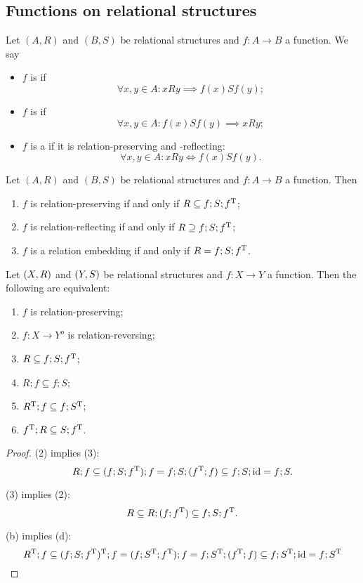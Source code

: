 \subsection{Functions on relational structures}
\begin{definition}
Let $(A, R)$ and $(B, S)$ be relational structures and $f: A\to B$ a function. We say
\begin{itemize}
\item $f$ is  if
\[ \forall x,y\in A: xRy \implies f(x)Sf(y); \]
\item $f$ is  if
\[ \forall x,y\in A: f(x)Sf(y) \implies xRy; \]
\item $f$ is a  if it is relation-preserving and -reflecting:
\[ \forall x,y\in A: xRy \iff f(x)Sf(y). \]
\end{itemize}
\end{definition}

\begin{lemma}
Let $(A, R)$ and $(B, S)$ be relational structures and $f: A\to B$ a function. Then
\begin{enumerate}
\item $f$ is relation-preserving \textup{if and only if} $R \subseteq f;S;f^{\mathrm{T}}$;
\item $f$ is relation-reflecting \textup{if and only if} $R \supseteq f;S;f^{\mathrm{T}}$;
\item $f$ is a relation embedding \textup{if and only if} $R = f;S;f^{\mathrm{T}}$.
\end{enumerate}
\end{lemma}

\begin{proposition} \label{relationPreserving}
Let $\left( X, R \right)$ and $\left( Y, S \right)$ be relational structures and $f: X\to Y$ a function. Then the following are equivalent:
\begin{enumerate}
\item $f$ is relation-preserving;
\item $f: X\to Y^o$ is relation-reversing;
\item $R \subseteq f;S;f^{\mathrm{T}}$;
\item $R;f \subseteq f;S$;
\item $R^{\mathrm{T}};f \subseteq f;S^{\mathrm{T}}$;
\item $f^{\mathrm{T}};R \subseteq S;f^{\mathrm{T}}$.
\end{enumerate}
\end{proposition}
\begin{proof}
(2) implies (3):
\[ R;f \subseteq (f;S;f^{\mathrm{T}});f = f;S;(f^{\mathrm{T}};f) \subseteq f;S;\operatorname{id} = f;S. \]

(3) implies (2):
\[ R \subseteq R;(f;f^{\mathrm{T}}) \subseteq f;S;f^{\mathrm{T}}. \]

(b) implies (d):
\[ R^{\mathrm{T}};f \subseteq (f;S;f^{\mathrm{T}})^{\mathrm{T}};f = (f;S^{\mathrm{T}};f^{\mathrm{T}});f = f;S^{\mathrm{T}};(f^{\mathrm{T}};f) \subseteq f;S^{\mathrm{T}};\operatorname{id} = f;S^{\mathrm{T}} \]
\end{proof}

